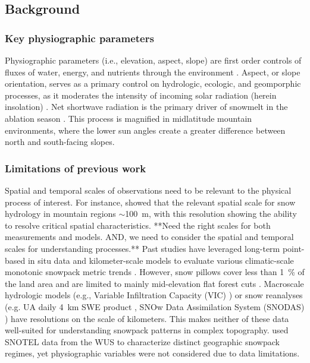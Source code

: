 % 
\subsection{Background}
\subsubsection{Key physiographic parameters}
Physiographic parameters (i.e., elevation, aspect, slope) are first order controls of fluxes of water, energy, and nutrients through the environment \citep{pelletierWhichWayYou2018a}. Aspect, or slope orientation, serves as a primary control on hydrologic, ecologic, and geomporphic processes, as it moderates the intensity of incoming solar radiation (herein insolation) \citep{broxtonRoleAspectQuantify2009}. Net shortwave radiation is the primary driver of snowmelt in the ablation season \citep{marksClimateEnergyExchange1992a}. This process is magnified in midlatitude mountain environments, where the lower sun angles create a greater difference between north and south-facing slopes. 

\subsubsection{Limitations of previous work}
Spatial and temporal scales of observations need to be relevant to the physical process of interest. For instance, \cite{bloschlScalingIssuesSnow1999} showed that the relevant spatial scale for snow hydrology in mountain regions $\sim$100~m, with this resolution showing the ability to resolve critical spatial characteristics. **Need the right scales for both measurements and models.  AND, we need to consider the spatial and temporal scales for understanding processes.** Past studies have leveraged long-term point-based in situ data \citep{clowChangesTimingSnowmelt2010,harpoldChangesSnowpackAccumulation2012a,kapnickCausesRecentChanges2012,musselmanWinterMeltTrends2021} and kilometer-scale models to evaluate various climatic-scale monotonic snowpack metric trends 
\citep{moteDECLININGMOUNTAINSNOWPACK2005, moteDramaticDeclinesSnowpack2018, zengSnowpackChange19822018, haleDriversSpatiotemporalPatterns2023}. However, snow pillows cover less than 1~\% of the land area and are limited to mainly mid-elevation flat forest cuts \citep{guan20102011Snow2013}. Macroscale hydrologic models (e.g., Variable Infiltration Capacity (VIC) \citep{liangSimpleHydrologicallyBased1994}) or snow reanalyses (e.g. UA daily 4~km SWE product \citep{broxtonLinkingSnowfallSnow2016}, SNOw Data Assimilation System (SNODAS) \citep{barrettNationalOperationalHydrologic2003}) have resolutions on the scale of kilometers. This makes neither of these data well-suited for understanding snowpack patterns in complex topography. \cite{trujilloSnowpackRegimesWestern2014} used SNOTEL data from the WUS to characterize distinct geographic snowpack regimes, yet physiographic variables were not considered due to data limitations.

